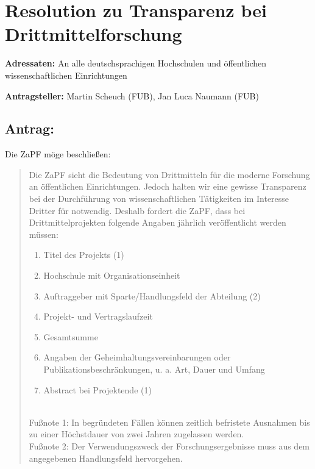 \documentclass[10pt,oneside]{scrartcl}
\begin{document}
\section*{Resolution zu Transparenz bei Drittmittelforschung}

\textbf{Adressaten:} An alle deutschsprachigen Hochschulen und öffentlichen wissenschaftlichen Einrichtungen

\textbf{Antragsteller:} Martin Scheuch (FUB), Jan Luca Naumann (FUB)

\subsection*{Antrag:}
Die ZaPF möge beschließen:
\begin{quote}
Die ZaPF sieht die Bedeutung von Drittmitteln für die moderne Forschung an öffentlichen Einrichtungen. Jedoch halten wir eine gewisse Transparenz bei der Durchführung von wissenschaftlichen Tätigkeiten im Interesse Dritter für notwendig. Deshalb fordert die ZaPF, dass bei Drittmittelprojekten folgende Angaben jährlich veröffentlicht werden müssen:
\begin{enumerate}
\item Titel des Projekts (1)
\item Hochschule mit Organisationseinheit
\item Auftraggeber mit Sparte/Handlungsfeld der Abteilung (2)
\item Projekt- und Vertragslaufzeit 
\item Gesamtsumme
\item Angaben der Geheimhaltungsvereinbarungen oder Publikationsbeschränkungen, u. a. Art, Dauer und Umfang
\item Abstract bei Projektende (1)
\end{enumerate}
~\\
Fußnote 1: In begründeten Fällen können zeitlich befristete Ausnahmen bis zu einer Höchstdauer von zwei Jahren zugelassen werden.\\

Fußnote 2: Der Verwendungszweck der Forschungsergebnisse muss aus dem angegebenen Handlungsfeld hervorgehen.\\


\end{quote}
\end{document}
